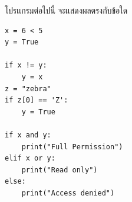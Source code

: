 ﻿%
\question โปรเเกรมต่อไปนี้ จะเเสดงผลตรงกับข้อใด
\begin{verbatim}
x = 6 < 5
y = True

if x != y:
    y = x
z = "zebra"
if z[0] == 'Z':
    y = True

if x and y:
    print("Full Permission")
elif x or y:
    print("Read only")
else:
    print("Access denied")
\end{verbatim}
